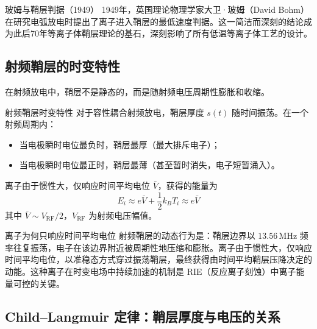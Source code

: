 \documentclass[12pt,a4paper,openany,oneside]{book}
\begin{document}
\begin{history}{玻姆与鞘层判据（1949）}{}
1949年，英国理论物理学家大卫·玻姆（David Bohm）在研究电弧放电时提出了离子进入鞘层的最低速度判据。这一简洁而深刻的结论成为此后70年等离子体鞘层理论的基石，深刻影响了所有低温等离子体工艺的设计。
\end{history}

\subsection{射频鞘层的时变特性}

在射频放电中，鞘层不是静态的，而是随射频电压周期性膨胀和收缩。

\begin{theorem}{射频鞘层时变特性}{}{}
\label{thm:rf-sheath}
对于容性耦合射频放电，鞘层厚度 $s(t)$ 随时间振荡。在一个射频周期内：
\begin{itemize}
\item 当电极瞬时电位最负时，鞘层最厚（最大排斥电子）；
\item 当电极瞬时电位最正时，鞘层最薄（甚至暂时消失，电子短暂涌入）。
\end{itemize}
离子由于惯性大，仅响应时间平均电位 $\bar{V}$，获得的能量为
\begin{equation}
\label{eq:ion-energy-rf}
E_i \approx e\bar{V} + \frac{1}{2}k_B T_i \approx e\bar{V}
\end{equation}
其中 $\bar{V} \sim V_{\text{RF}}/2$，$V_{\text{RF}}$ 为射频电压幅值。
\end{theorem}

\begin{insight}{离子为何只响应时间平均电位}{}
射频鞘层的动态行为是：鞘层边界以 $13.56\,\mathrm{MHz}$ 频率往复振荡，电子在该边界附近被周期性地压缩和膨胀。离子由于惯性大，仅响应时间平均电位，以准稳态方式穿过振荡鞘层，最终获得由时间平均鞘层压降决定的动能。这种离子在时变电场中持续加速的机制是 RIE（反应离子刻蚀）中离子能量可控的关键。
\end{insight}

\subsection{Child--Langmuir 定律：鞘层厚度与电压的关系}
\end{document}
